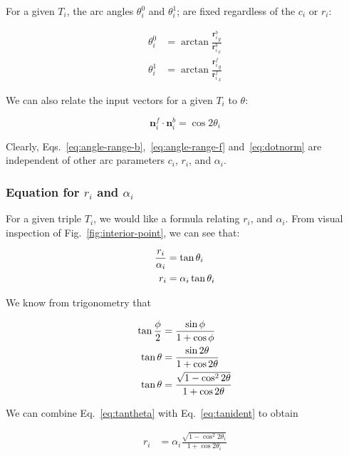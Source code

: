 \documentclass{article}
\begin{document}
For a given $T_i$, the arc angles $\theta^0_i$ and $\theta^{1}_{i}$; are fixed regardless of the $c_i$ or $r_{i}$:

\begin{align}
  \label{eq:angle-range-b}
  \theta^{0}_{i} &= \arctan \frac{{\mathbf{r}^{b}_{i}}_{y}}{{\mathbf{r}^{b}_{i}}_{x}}\\
  \label{eq:angle-range-f}
  \theta^{1}_{i} &= \arctan \frac{{\mathbf{r}^{f}_{i}}_{y}}{{\mathbf{r}^{f}_{i}}_{x}}
\end{align}

We can also relate the input vectors for a given $T_{i}$ to $\theta$:

\begin{equation}
  \label{eq:dotnorm}
  \mathbf{n}^{f}_{i} \cdot \mathbf{n}^{b}_{i} = \cos 2\theta_i
\end{equation}

Clearly, Eqs.~\eqref{eq:angle-range-b},~\eqref{eq:angle-range-f} and~\eqref{eq:dotnorm} are independent of other arc parameters $c_{i}$, $r_{i}$, and $\alpha_i$.

\subsubsection{Equation for $r_i$ and $\alpha_{i}$}

For a given triple $T_{i}$, we would like a formula relating $r_{i}$, and $\alpha_{i}$.  From visual inspection of Fig.~\ref{fig:interior-point}, we can see that:

\begin{align}
  \notag
  \frac{r_i}{\alpha_{i}} &= \tan \theta_i\\
  \label{eq:tantheta}
  r_i &= \alpha_{i}\tan \theta_i
\end{align}

We know from trigonometry that

\begin{align}
  \notag
  \tan \frac{\phi}{2} &= \frac{\sin\phi}{1+\cos\phi}\\
  \notag
  \tan \theta &= \frac{\sin 2\theta}{1+\cos 2\theta}\\
  \label{eq:tanident}
  \tan \theta &= \frac{\sqrt{1-\cos^{2} 2\theta}}{1+\cos 2\theta}
\end{align}

We can combine Eq.~\eqref{eq:tantheta} with Eq.~\eqref{eq:tanident} to obtain

\begin{align}
  \label{eq:radiustan}
  r_{i} &= \alpha_i\frac{\sqrt{1-\cos^{2} 2\theta_i}}{1+\cos 2\theta_i}
\end{align}
\end{document}
